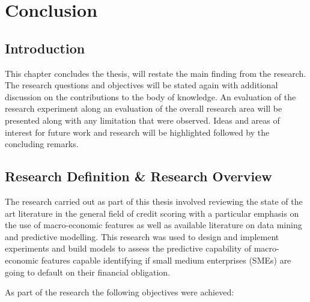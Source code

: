 \chapter{Conclusion} %

\label{Chapter6} %



\section{Introduction}
This chapter concludes the thesis, will restate the main finding from the research. The research questions and objectives will be stated again with additional discussion on the contributions to the body of knowledge. An evaluation of the research experiment along an evaluation of the overall research area will be presented along with any limitation that were observed. Ideas and areas of interest for future work and research will be highlighted followed by the concluding remarks.

\section{Research Definition \& Research Overview}
The research carried out as part of this thesis involved reviewing the state of the art literature in the general field of credit scoring with a particular emphasis on the use of macro-economic features as well as available literature on data mining and predictive modelling. This research was used to design and implement experiments and build models to assess the predictive capability of macro-economic features capable identifying if small medium enterprises (SMEs) are going to default on their financial obligation. 

As part of the research the following objectives were achieved:

